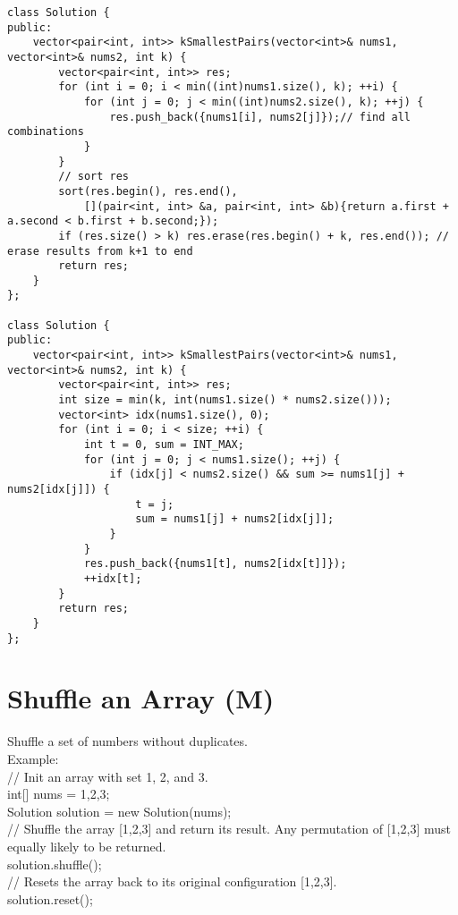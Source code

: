 \begin{lstlisting}
class Solution {
public:
    vector<pair<int, int>> kSmallestPairs(vector<int>& nums1, vector<int>& nums2, int k) {
        vector<pair<int, int>> res;
        for (int i = 0; i < min((int)nums1.size(), k); ++i) {
            for (int j = 0; j < min((int)nums2.size(), k); ++j) {
                res.push_back({nums1[i], nums2[j]});// find all combinations
            }
        }
        // sort res
        sort(res.begin(), res.end(), 
            [](pair<int, int> &a, pair<int, int> &b){return a.first + a.second < b.first + b.second;});
        if (res.size() > k) res.erase(res.begin() + k, res.end()); // erase results from k+1 to end
        return res;
    }
};

class Solution {
public:
    vector<pair<int, int>> kSmallestPairs(vector<int>& nums1, vector<int>& nums2, int k) {
        vector<pair<int, int>> res;
        int size = min(k, int(nums1.size() * nums2.size()));
        vector<int> idx(nums1.size(), 0);
        for (int i = 0; i < size; ++i) {
            int t = 0, sum = INT_MAX;
            for (int j = 0; j < nums1.size(); ++j) {
                if (idx[j] < nums2.size() && sum >= nums1[j] + nums2[idx[j]]) {
                    t = j;
                    sum = nums1[j] + nums2[idx[j]];
                }
            }
            res.push_back({nums1[t], nums2[idx[t]]});
            ++idx[t];
        }
        return res;
    }
};
\end{lstlisting}


\section{Shuffle an Array (M)}
Shuffle a set of numbers without duplicates.\\

Example:\\
// Init an array with set 1, 2, and 3.\\
int[] nums = {1,2,3};\\
Solution solution = new Solution(nums);\\

// Shuffle the array [1,2,3] and return its result. Any permutation of [1,2,3] must equally likely to be returned.\\
solution.shuffle();\\

// Resets the array back to its original configuration [1,2,3].\\
solution.reset();\\

